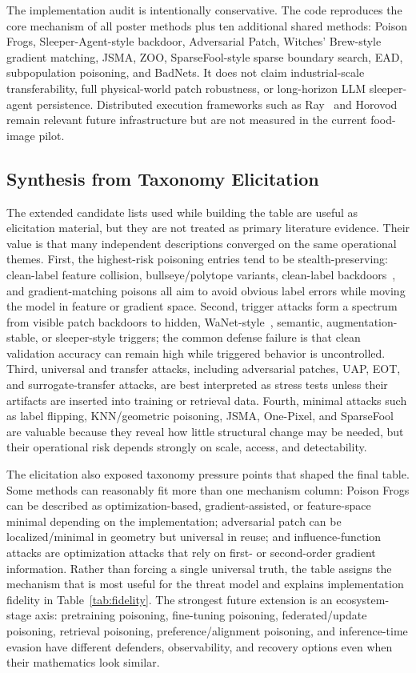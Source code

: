 \documentclass[conference]{IEEEtran}
\begin{document}
The implementation audit is intentionally conservative. The code reproduces the core mechanism of all poster methods plus ten additional shared methods: Poison Frogs, Sleeper-Agent-style backdoor, Adversarial Patch, Witches' Brew-style gradient matching, JSMA, ZOO, SparseFool-style sparse boundary search, EAD, subpopulation poisoning, and BadNets. It does not claim industrial-scale transferability, full physical-world patch robustness, or long-horizon LLM sleeper-agent persistence. Distributed execution frameworks such as Ray~\cite{moritz2018ray} and Horovod~\cite{sergeev2018horovod} remain relevant future infrastructure but are not measured in the current food-image pilot.

\subsection{Synthesis from Taxonomy Elicitation}

The extended candidate lists used while building the table are useful as elicitation material, but they are not treated as primary literature evidence. Their value is that many independent descriptions converged on the same operational themes. First, the highest-risk poisoning entries tend to be stealth-preserving: clean-label feature collision, bullseye/polytope variants, clean-label backdoors~\cite{cleanlabelbackdoor}, and gradient-matching poisons all aim to avoid obvious label errors while moving the model in feature or gradient space. Second, trigger attacks form a spectrum from visible patch backdoors to hidden, WaNet-style~\cite{wanet}, semantic, augmentation-stable, or sleeper-style triggers; the common defense failure is that clean validation accuracy can remain high while triggered behavior is uncontrolled. Third, universal and transfer attacks, including adversarial patches, UAP, EOT, and surrogate-transfer attacks, are best interpreted as stress tests unless their artifacts are inserted into training or retrieval data. Fourth, minimal attacks such as label flipping, KNN/geometric poisoning, JSMA, One-Pixel, and SparseFool are valuable because they reveal how little structural change may be needed, but their operational risk depends strongly on scale, access, and detectability.

The elicitation also exposed taxonomy pressure points that shaped the final table. Some methods can reasonably fit more than one mechanism column: Poison Frogs can be described as optimization-based, gradient-assisted, or feature-space minimal depending on the implementation; adversarial patch can be localized/minimal in geometry but universal in reuse; and influence-function attacks are optimization attacks that rely on first- or second-order gradient information. Rather than forcing a single universal truth, the table assigns the mechanism that is most useful for the threat model and explains implementation fidelity in Table~\ref{tab:fidelity}. The strongest future extension is an ecosystem-stage axis: pretraining poisoning, fine-tuning poisoning, federated/update poisoning, retrieval poisoning, preference/alignment poisoning, and inference-time evasion have different defenders, observability, and recovery options even when their mathematics look similar.
\end{document}
